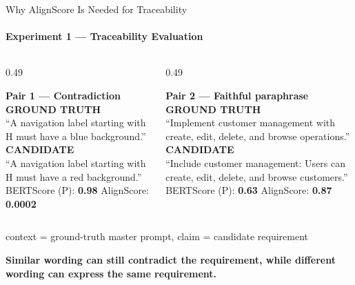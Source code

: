 \documentclass[aspectratio=169,11pt,c]{beamer}
\newcommand{\takeaway}[1]{\begin{center}{\bfseries\color{accentorange}\large #1}\end{center}}
\newcommand{\calllbl}[1]{{\footnotesize\bfseries\color{primaryblue}\MakeUppercase{#1}}\\[2pt]}
\begin{document}
\begin{frame}{Why AlignScore Is Needed for Traceability}
  \framesubtitle{Experiment 1 --- Traceability Evaluation}
  \begin{columns}[T]
    \begin{column}{0.49\textwidth}
      \begin{flagpanel}
        \scriptsize\textbf{Pair 1 --- Contradiction}\\[1pt]
        \calllbl{Ground truth} ``A navigation label starting with H must have a blue background.''\\[1pt]
        \calllbl{Candidate} ``A navigation label starting with H must have a red background.''\\[1pt]
        BERTScore (P): \textbf{0.98} \quad AlignScore: \textbf{0.0002}
      \end{flagpanel}
    \end{column}
    \begin{column}{0.49\textwidth}
      \begin{goodpanel}
        \scriptsize\textbf{Pair 2 --- Faithful paraphrase}\\[1pt]
        \calllbl{Ground truth} ``Implement customer management with create, edit, delete, and browse operations.''\\[1pt]
        \calllbl{Candidate} ``Include customer management: Users can create, edit, delete, and browse customers.''\\[1pt]
        BERTScore (P): \textbf{0.63} \quad AlignScore: \textbf{0.87}
      \end{goodpanel}
    \end{column}
  \end{columns}
  \vspace{2pt}
  \begin{center}\scriptsize\ttfamily context = ground-truth master prompt, \quad claim = candidate requirement\end{center}
  \takeaway{Similar wording can still contradict the requirement, while different wording can express the same requirement.}

\end{frame}
\end{document}
